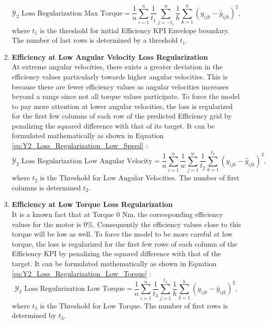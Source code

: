 \documentclass{report} %
\begin{document}
\begin{enumerate}
\begin{enumerate}
\begin{equation}
    \text{$\mathcal{Y}_2$ Loss Regularization Max Torque} = \frac{1}{n} \sum_{i=1}^{n} \frac{1}{t_{1}} \sum_{j=-t_{1}}^{w} \frac{1}{h} \sum_{k=1}^{h} (y_{ijk} - \hat{y}_{ijk})^2,
    \label{eq:Y2_Loss_Regularization_MM_Max_Torque}
\end{equation}
where \(t_{1}\) is the threshold for initial Efficiency \ac{KPI} Envelope boundary. The number of last rows is determined by a threshold $t_{1}$.\\
\item \textbf{Efficiency at Low Angular Velocity Loss Regularization} \\
At extreme angular velocities, there exists a greater deviation in the efficiency values particularly towards higher angular velocities. This is because there are 
fewer efficiency values as angular velocities increases beyond a range since not all torque values participate.
To force the model to pay more attention at lower angular velocities, the loss is regularized for the first few columns of each row of the predicted Efficiency grid 
by penalizing the squared difference with that of its target. It can be formulated mathematically as shown in Equation \ref{eq:Y2_Loss_Regularization_Low_Speed} :
\begin{equation}
    \text{$\mathcal{Y}_2$ Loss Regularization Low Angular Velocity} = \frac{1}{n} \sum_{i=1}^{n} \frac{1}{w} \sum_{j=1}^{w} \frac{1}{t_{2}} \sum_{k=1}^{t_{2}} (y_{ijk} - \hat{y}_{ijk})^2,
    \label{eq:Y2_Loss_Regularization_Low_Speed}
\end{equation}
where \(t_{2}\) is the Threshold for Low Angular Velocities. The number of first columns is determined $t_{2}$. \\
\item \textbf{Efficiency at Low Torque Loss Regularization} \\
It is a known fact that at Torque 0 Nm, the corresponding efficiency values for the motor is 0\%. 
Consequently the efficiency values close to this torque will be low as well.
To force the model to be more careful at low torque, the loss is regularized for the first few rows of each column of the Efficiency \ac{KPI} by penalizing the 
squared difference with that of the target. 
It can be formulated mathematically as shown in Equation \ref{eq:Y2_Loss_Regularization_Low_Torque} :
\begin{equation}
    \text{$\mathcal{Y}_2$ Loss Regularization Low Torque} = \frac{1}{n} \sum_{i=1}^{n} \frac{1}{t_{3}} \sum_{j=1}^{t_{3}} \frac{1}{h} \sum_{k=1}^{h} (y_{ijk} - \hat{y}_{ijk})^2,
    \label{eq:Y2_Loss_Regularization_Low_Torque}
\end{equation}
where \(t_{3}\) is the Threshold for Low Torque. The number of first rows is determined by $t_{3}$.\\


\end{enumerate}
\end{enumerate}
\end{document}
